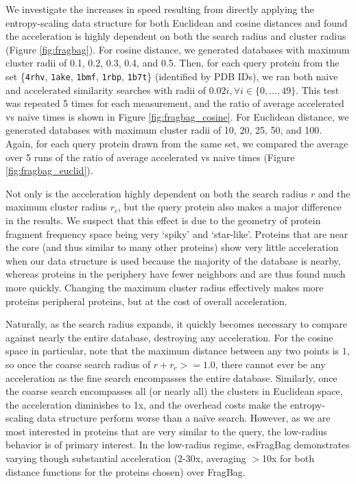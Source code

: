 \documentclass[review,preprint,12pt]{elsarticle}
\theoremstyle{definition}
\theoremstyle{remark}
\numberwithin{equation}{section}
\begin{document}
We investigate the increases in speed resulting from directly applying the entropy-scaling data structure for both Euclidean and cosine distances and found the acceleration is highly dependent on both the search radius and cluster radius (Figure \ref{fig:fragbag}).
For cosine distance, we generated databases with maximum cluster radii of 0.1, 0.2, 0.3, 0.4, and 0.5.
Then, for each query protein from the set \{\texttt{4rhv}, \texttt{1ake}, \texttt{1bmf}, \texttt{1rbp}, \texttt{1b7t}\} (identified by PDB IDs), we ran both naive and accelerated similarity searches with radii of $0.02i, \forall i \in \{0,\ldots,49\}$.
This test was repeated 5 times for each measurement, and the ratio of average accelerated vs naive times is shown in Figure \ref{fig:fragbag_cosine}.
For Euclidean distance, we generated databases with maximum cluster radii of 10, 20, 25, 50, and 100.
Again, for each query protein drawn from the same set, we compared the average over 5 runs of the ratio of average accelerated vs naive times (Figure \ref{fig:fragbag_euclid}).

Not only is the acceleration highly dependent on both the search radius $r$ and the maximum cluster radius $r_c$,
but the query protein also makes a major difference in the results.
We suspect that this effect is due to the geometry of protein fragment frequency space being very `spiky' and `star-like'.
Proteins that are near the core (and thus similar to many other proteins) show very little acceleration when our data structure is used because the majority of the database is nearby, whereas proteins in the periphery have fewer neighbors and are thus found much more quickly.
Changing the maximum cluster radius effectively makes more proteins peripheral proteins, but at the cost of overall acceleration.

Naturally, as the search radius expands, it quickly becomes necessary to compare against nearly the entire database, destroying any acceleration.
For the cosine space in particular, note that the maximum distance between any two points is $1$, so once the coarse search radius of $r+r_c >= 1.0$, there cannot ever be any acceleration as the fine search encompasses the entire database.
Similarly, once the coarse search encompasses all (or nearly all) the clusters in Euclidean space, the acceleration diminishes to 1x, and the overhead costs make the entropy-scaling data structure perform worse than a na\"ive search.
However, as we are most interested in proteins that are very similar to the query, the low-radius behavior is of primary interest.
In the low-radius regime, esFragBag demonstrates varying though substantial acceleration (2-30x, averaging $>$10x for both distance functions for the proteins chosen) over FragBag.
\end{document}

